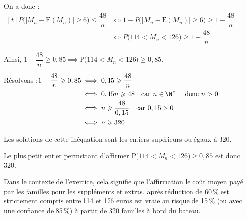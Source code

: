 \begin{enumerate}
\begin{enumerate}
			On a donc :\quad $\begin{aligned}[t]
				P\big(\big|M_n - \mathrm{E}(M_n)\big| \geqslant 6\big) \leqslant \dfrac{48}{n}
					&\iff 1 - P\big(\big|M_n - \mathrm{E}(M_n)\big| \geqslant 6\big) \geqslant 1 - \dfrac{48}{n} \\
					&\iff P\big(114 < M_n < 126\big) \geqslant 1 - \dfrac{48}{n}
			\end{aligned}$

			Ainsi, \quad $1 - \dfrac{48}{n} \geqslant 0,85 \implies \mathrm{P}\big(114<M_{n}<126\big) \geqslant 0,85$.

			Résolvons :\quad $ \begin{aligned}[t]
				1 - \dfrac{48}{n} \geqslant 0,85
					&\iff 0,15 \geqslant \dfrac{48}{n}\\
					&\iff 0,15 n \geqslant 48\quad \text{car } n \in \N^{*} \quad\text{ donc } n>0\\
					&\iff n \geqslant \dfrac{48}{0,15}\quad \text{car } 0,15>0\\
					&\iff n \geqslant 320\\
			\end{aligned}$

			Les solutions de cette inéquation sont les entiers supérieurs ou égaux à 320.

			Le plus petit entier permettant d'affirmer $\mathrm{P}\big(114<M_{n}<126\big) \geqslant 0,85$ est donc 320.

			Dans le contexte de l'exercice, cela signifie que l'affirmation \og le coût moyen payé par les familles pour les suppléments et extras, après réduction de 60\,\% est strictement compris entre 114 et 126 euros\fg{} est vraie au risque de 15\,\% (ou avec une confiance de 85\,\%) à partir de 320 familles à bord du bateau.

		\end{enumerate}
	\end{enumerate}
